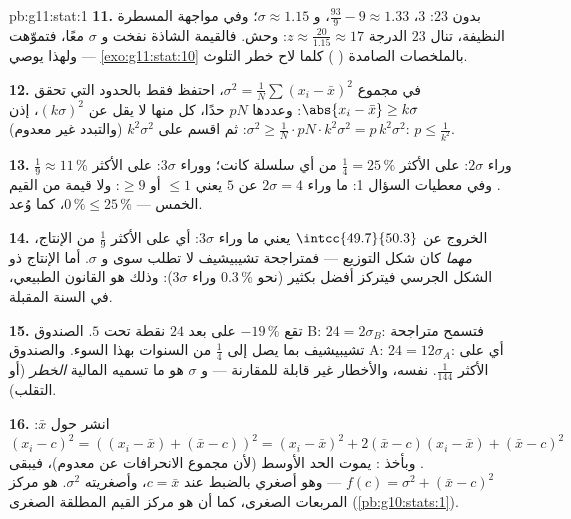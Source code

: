 \begin{solution}{pb:g11:stat:1}
\textbf{11.} بدون $23$:  $3$، 
$\frac{93}{9} - 9 \approx 1.33$، و $\sigma \approx 1.15$؛
وفي مواجهة المسطرة النظيفة، تنال $23$ الدرجة
$z \approx \frac{20}{1.15} \approx 17$: وحش. فالقيمة الشاذة
نفخت  و $\sigma$ معًا، فتموّهت ---
ولهذا يوصي \cref{exo:g11:stat:10} بالملخصات الصامدة
( ) كلما لاح خطر التلوث.

\textbf{12.} في مجموع 
$\sigma^2 = \frac1N \sum (x_i - \bar x)^2$، احتفظ فقط بالحدود
التي تحقق $\abs{x_i - \bar x} \geq k\sigma$: وعددها $pN$
حدًا، كل منها لا يقل عن $(k\sigma)^2$، إذن
$\sigma^2 \geq \frac{1}{N} \cdot pN \cdot k^2\sigma^2 =
p\,k^2\sigma^2$: ثم اقسم على $k^2 \sigma^2$ (والتبدد غير معدوم):
$p \leq \frac{1}{k^2}$.

\textbf{13.} وراء $2\sigma$: على الأكثر $\frac14 = 25\,\%$ من
أي سلسلة كانت؛ ووراء $3\sigma$: على الأكثر
$\frac19 \approx 11\,\%$. وفي معطيات السؤال 1: ما وراء
$2\sigma = 4$ عن  $5$ يعني $\leq 1$ أو $\geq 9$:
ولا قيمة من القيم الخمس --- $0\,\% \leq 25\,\%$، كما وُعد.

\textbf{14.} الخروج عن $\intcc{49.7}{50.3}$ يعني ما وراء
$3\sigma$: أي على الأكثر $\frac19$ من الإنتاج، \emph{مهما}
كان شكل التوزيع --- فمتراجحة تشيبيشيف لا تطلب سوى
 و $\sigma$. أما الإنتاج ذو الشكل الجرسي فيتركز أفضل
بكثير (نحو $0.3\,\%$ وراء $3\sigma$): وذلك هو القانون الطبيعي،
في السنة المقبلة.

\textbf{15.} تقع $-19\,\%$ على بعد $24$ نقطة تحت  $5$.
الصندوق B: $24 = 2\sigma_B$: فتسمح متراجحة تشيبيشيف بما يصل إلى
$\frac14$ من السنوات بهذا السوء. والصندوق A: $24 = 12\sigma_A$: أي
على الأكثر $\frac{1}{144}$.  نفسه، والأخطار غير قابلة للمقارنة ---
و $\sigma$ هو ما تسميه المالية \emph{الخطر} (أو التقلب).

\textbf{16.} انشر حول $\bar x$:
$(x_i - c)^2 = \left((x_i - \bar x) + (\bar x - c)\right)^2
= (x_i - \bar x)^2 + 2(\bar x - c)(x_i - \bar x) +
(\bar x - c)^2$. وبأخذ : يموت الحد الأوسط (لأن مجموع الانحرافات
عن  معدوم)، فيبقى
$f(c) = \sigma^2 + (\bar x - c)^2$ --- وهو أصغري بالضبط عند
$c = \bar x$، وأصغريته $\sigma^2$.  هو
مركز المربعات الصغرى، كما أن  هو مركز القيم المطلقة
الصغرى (\cref{pb:g10:stats:1}).


\end{solution}
